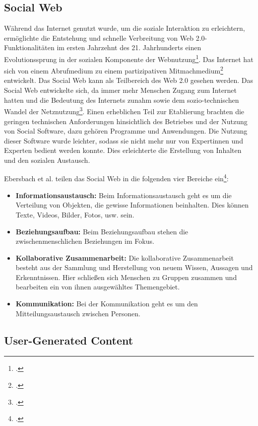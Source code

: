 \subsection{Social Web}

Während das Internet genutzt wurde, um die soziale Interaktion zu erleichtern, ermöglichte die Entstehung und schnelle Verbreitung von Web 2.0-Funktionalitäten im ersten Jahrzehnt des 21. Jahrhunderts einen Evolutionssprung in der sozialen Komponente der Webnutzung\footcite[S. 745-750]{obarSocialMedia}. Das Internet hat sich von einem Abrufmedium zu einem partizipativen Mitmachmedium\footcite{panke} entwickelt. Das Social Web kann als Teilbereich des Web 2.0 gesehen werden. Das Social Web entwickelte sich, da immer mehr Menschen Zugang zum Internet hatten und die Bedeutung des Internets zunahm sowie dem sozio-technischen Wandel der Netznutzung\footcite[S. 350]{griesbaum}. Einen erheblichen Teil zur Etablierung brachten die geringen technischen Anforderungen hinsichtlich des Betriebes und der Nutzung von Social Software, dazu gehören Programme und Anwendungen. Die Nutzung dieser Software wurde leichter, sodass sie nicht mehr nur von Expertinnen und Experten bedient werden konnte. Dies erleichterte die Erstellung von Inhalten und den sozialen Austausch.

Ebersbach et al. teilen das Social Web in die folgenden vier Bereiche ein\footcite[S. 35-36]{ebersbach}:

\begin{itemize}
	\item \textbf{Informationsaustausch:} Beim Informationsaustausch geht es um die Verteilung von Objekten, die gewisse Informationen beinhalten.  Dies können Texte, Videos, Bilder, Fotos, usw. sein.
	\item \textbf{Beziehungsaufbau:} Beim Beziehungsaufbau stehen die zwischenmenschlichen Beziehungen im Fokus. 
	\item \textbf{Kollaborative Zusammenarbeit:} Die kollaborative Zusammenarbeit besteht aus der Sammlung und Herstellung von neuem Wissen, Aussagen und Erkenntnissen. Hier schließen sich Menschen zu Gruppen zusammen und bearbeiten ein von ihnen ausgewähltes Themengebiet.
	\item \textbf{Kommunikation:} Bei der Kommunikation geht es um den Mitteilungsaustausch zwischen Personen.
\end{itemize}


\subsection{User-Generated Content}

